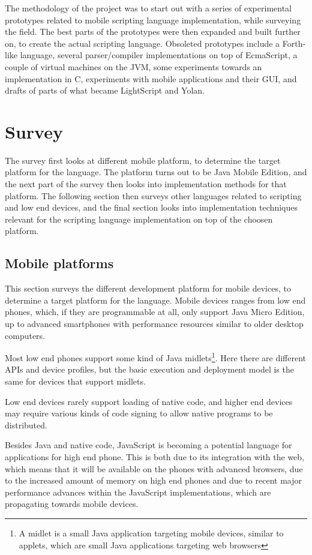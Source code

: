 \documentclass[11pt]{report}
\begin{document}
The methodology of the project was to start out with a series of experimental prototypes related to mobile scripting language implementation, while surveying the field. 
The best parts of the prototypes were then expanded and built further on, to create the actual scripting language.
Obsoleted prototypes include a Forth-like language, several parser/compiler implementations on top of EcmaScript, a couple of virtual machines on the JVM, some experiments towards an implementation in C, experiments with mobile applications and their GUI, and drafts of parts of what became LightScript and Yolan.


\chapter{Survey}
\label{survey}
The survey first looks at different mobile platform, to determine the target platform for the language. 
The platform turns out to be Java Mobile Edition, and the next part of the survey then looks into implementation methods for that platform.
The following section then surveys other languages related to scripting and low end devices, and the final section looks into implementation techniques relevant for the scripting language implementation on top of the choosen platform.

\section{Mobile platforms}

This section surveys the different development platform for mobile devices, to determine a target platform for the language.
Mobile devices ranges from low end phones, which, if they are programmable at all, only support Java Micro Edition, up to advanced smartphones with performance resources similar to older desktop computers.

Most low end phones support some kind of Java midlets\footnote{A midlet is a small Java application targeting mobile devices, similar to applets, which are small Java applications targeting web browsers}.
Here there are different APIs and device profiles, but the basic execution and deployment model is the same for devices that support midlets.

Low end devices rarely support loading of native code, and higher end devices may require various kinds of code signing to allow native programs to be distributed.

Besides Java and native code, JavaScript is becoming a potential language for applications for high end phone. 
This is both due to its integration with the web, which means that it will be available on the phones with advanced browsers, due to the increased amount of memory on high end phones
and due to recent major performance advances within the JavaScript implementations, which are propagating towards mobile devices.
\end{document}
